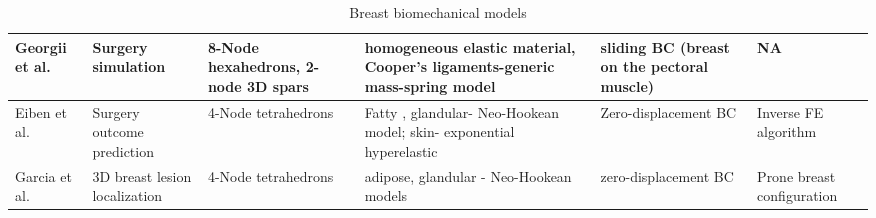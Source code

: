 \begin{sidewaystable}[!h]
\begin{tabularx}{22cm}{|p{2.5cm}|p{2.5cm}|p{3.5cm}|X|p{3.5cm}|p{2.5cm}|}
 Georgii et al.  \citep{georgii_simulation_2016}&Surgery simulation & 8-Node hexahedrons, 2-node 3D spars & homogeneous elastic material, Cooper's ligaments-generic mass-spring model & sliding BC (breast on the pectoral muscle) & NA\\
   \hline
  Eiben et al. \citep{eiben_surface_2016} & Surgery outcome prediction & 4-Node tetrahedrons & Fatty , glandular- Neo-Hookean model; skin- exponential hyperelastic & Zero-displacement BC & Inverse FE algorithm \\ 
   \hline
  Garcia et al. \citep{garcia_mapping_2017} & 3D breast lesion localization & 4-Node tetrahedrons & adipose, glandular  - Neo-Hookean models &zero-displacement BC & Prone breast configuration\\
   \hline
    \end{tabularx}
     \caption{Breast biomechanical models}
     \label{table:mechanical_models_table}
\end{sidewaystable}


